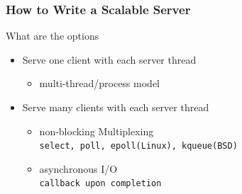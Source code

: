 \documentclass[aspectratio=43]{beamer}
\begin{document}
\begin{frame}
 \partpage
\end{frame}
\begin{frame}
  \frametitle{How to Write a Scalable Server}
\hspace*{2em} \begin{minipage}{.8\textwidth}
What are the options
\begin{itemize}
\item Serve one client with each server thread
\begin{itemize}
\item multi-thread/process model
\end{itemize}
\vspace{0.5em}
\item Serve many clients with each server thread
\begin{itemize}
\item non-blocking Multiplexing\\
{\footnotesize \tt select, poll, epoll(Linux), kqueue(BSD)} \\[0.5em]
\item asynchronous I/O\\
{\footnotesize \tt callback upon completion}
\end{itemize}
\end{itemize}
\end{minipage}
\end{frame}
\end{document}
